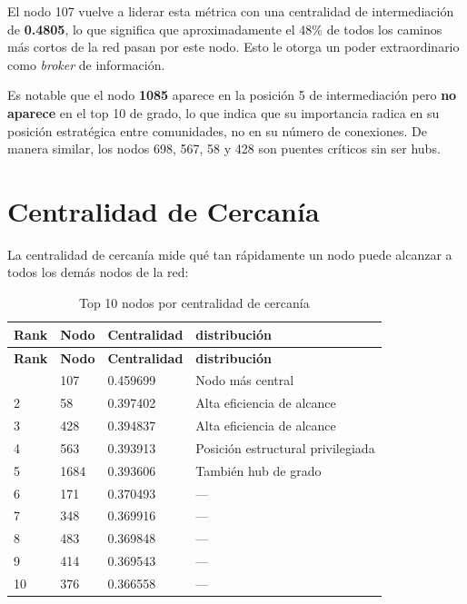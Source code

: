 \documentclass[12pt,a4paper,oneside,openany]{book}
\begin{document}
\begin{hallazgobox}
El nodo 107 vuelve a liderar esta métrica con una centralidad de intermediación
de \textbf{0.4805}, lo que significa que aproximadamente el 48\% de todos los
caminos más cortos de la red pasan por este nodo. Esto le otorga un poder
extraordinario como \textit{broker} de información.

Es notable que el nodo \textbf{1085} aparece en la posición 5 de intermediación
pero \textbf{no aparece} en el top 10 de grado, lo que indica que su importancia
radica en su posición estratégica entre comunidades, no en su número de conexiones.
De manera similar, los nodos 698, 567, 58 y 428 son puentes críticos sin ser hubs.
\end{hallazgobox}

\section{Centralidad de Cercanía}

La centralidad de cercanía mide qué tan rápidamente un nodo puede alcanzar a todos
los demás nodos de la red:

\begin{xltabular}{\linewidth}{C{1.2cm}C{1.5cm}C{2.5cm}X}
  \caption{Top 10 nodos por centralidad de cercanía}\label{tab:closeness}\\
  \toprule
  \textbf{Rank} & \textbf{Nodo} & \textbf{Centralidad} & \textbf{distribución} \\
  \midrule
  \endfirsthead
  \toprule
  \textbf{Rank} & \textbf{Nodo} & \textbf{Centralidad} & \textbf{distribución} \\
  \midrule
  \endhead
  \bottomrule
    & 107  & 0.459699 & Nodo más central \\
  2  & 58   & 0.397402 & Alta eficiencia de alcance \\
  3  & 428  & 0.394837 & Alta eficiencia de alcance \\
  4  & 563  & 0.393913 & Posición estructural privilegiada \\
  5  & 1684 & 0.393606 & También hub de grado \\
  6  & 171  & 0.370493 & --- \\
  7  & 348  & 0.369916 & --- \\
  8  & 483  & 0.369848 & --- \\
  9  & 414  & 0.369543 & --- \\
  10 & 376  & 0.366558 & --- \\
  \bottomrule
\end{xltabular}
\end{document}
